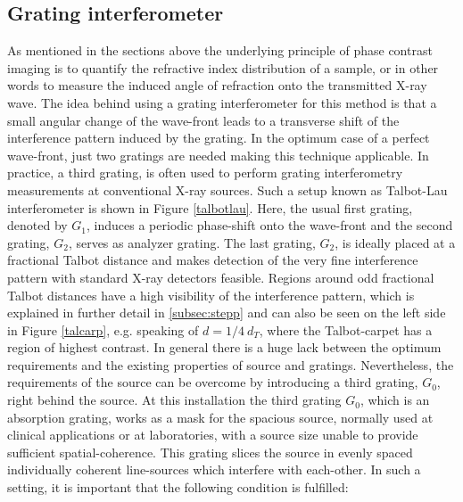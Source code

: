 \subsection{Grating interferometer}\label{subsec:gi}
As mentioned in the sections above the underlying principle of phase contrast imaging is to quantify the refractive index distribution of a sample, or in other words to measure the induced angle of refraction onto the transmitted X-ray wave. The idea behind using a grating interferometer for this method is that a small angular change of the wave-front leads to a transverse shift of the interference pattern induced by the grating. In the optimum case of a perfect wave-front, just two gratings are needed making this technique applicable. In practice, a third grating, is often used to perform grating interferometry measurements at conventional X-ray sources. Such a setup known as Talbot-Lau interferometer is shown in Figure \ref{talbotlau}. Here, the usual first grating, denoted by $G_{1}$, induces a periodic phase-shift onto the wave-front and the second grating, $G_{2}$, serves as analyzer grating. The last grating, $G_{2}$, is ideally placed at a fractional Talbot distance and makes detection of the very fine interference pattern with standard X-ray detectors feasible.
Regions around odd fractional Talbot distances have a high visibility of the interference pattern, which is explained in further detail in \ref{subsec:stepp} and can also be seen on the left side in Figure \ref{talcarp}, e.g. speaking of $d = 1/4\ d_{T}$, where the Talbot-carpet has a region of highest contrast. In general there is a huge lack between the optimum requirements and the existing properties of source and gratings. Nevertheless, the requirements of the source can be overcome by introducing a third grating, $G_{0}$, right behind the source. At this installation the third grating $G_{0}$, which is an absorption grating, works as a mask for the spacious source, normally used at clinical applications or at laboratories, with a source size unable to provide sufficient spatial-coherence. This grating slices the source in evenly spaced individually coherent line-sources which interfere with each-other. In such a setting, it is important that the following condition is fulfilled:

